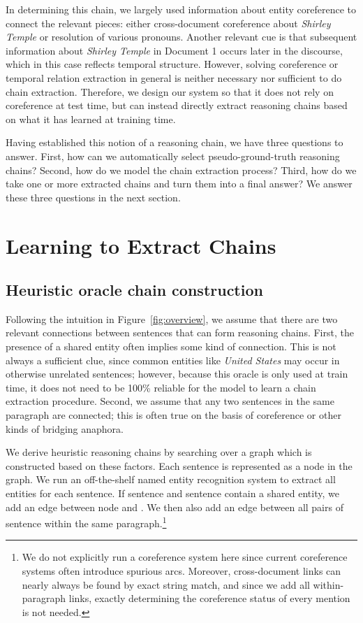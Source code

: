 \documentclass[11pt,a4paper]{article}
\begin{document}
In determining this chain, we largely used information about entity coreference to connect the relevant pieces: either cross-document coreference about \emph{Shirley Temple} or resolution of various pronouns. Another relevant cue is that subsequent information about \emph{Shirley Temple} in Document 1 occurs later in the discourse, which in this case reflects temporal structure. However, solving coreference or temporal relation extraction in general is neither necessary nor sufficient to do chain extraction. Therefore, we design our system so that it does not rely on coreference at test time, but can instead directly extract reasoning chains based on what it has learned at training time.

Having established this notion of a reasoning chain, we have three questions to answer. First, how can we automatically select pseudo-ground-truth reasoning chains? Second, how do we model the chain extraction process? Third, how do we take one or more extracted chains and turn them into a final answer? We answer these three questions in the next section.

\section{Learning to Extract Chains}

\subsection{Heuristic oracle chain construction}

Following the intuition in Figure~\ref{fig:overview}, we assume that there are two relevant connections between sentences that can form reasoning chains. First, the presence of a shared entity often implies some kind of connection. This is not always a sufficient clue, since common entities like \emph{United States} may occur in otherwise unrelated sentences; however, because this oracle is only used at train time, it does not need to be 100\% reliable for the model to learn a chain extraction procedure. Second, we assume that any two sentences in the same paragraph are connected; this is often true on the basis of coreference or other kinds of bridging anaphora.

We derive heuristic reasoning chains by searching over a graph which is constructed based on these factors. Each sentence  is represented as a node  in the graph. We run an off-the-shelf named entity recognition system to extract all entities for each sentence. If sentence  and sentence  contain a shared entity, we add an edge between node  and . We then also add an edge between all pairs of sentence within the same paragraph.\footnote{We do not explicitly run a coreference system here since current coreference systems often introduce spurious arcs. Moreover, cross-document links can nearly always be found by exact string match, and since we add all within-paragraph links, exactly determining the coreference status of every mention is not needed.}
\end{document}
